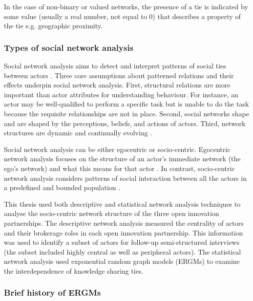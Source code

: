 In the case of non-binary or valued networks, the presence of a tie is indicated by some value (usually a real number, not equal to 0) that describes a property of the tie e.g. geographic proximity.

\subsubsection{Types of social network analysis}

Social network analysis aims to detect and interpret patterns of social ties between actors \citep{de2011exploratory}. Three core assumptions about patterned relations and their effects underpin social network analysis. First, structural relations are more important than actor attributes for understanding behaviour. For instance, an actor may be well-qualified to perform a specific task but is unable to do the task because the requisite relationships are not in place. Second, social networks shape and are shaped by the perceptions, beliefs, and actions of actors. Third, network structures are dynamic and continually evolving \citep{knoke2008social}. \medskip

Social network analysis can be either egocentric or socio-centric. Egocentric network analysis focuses on the structure of an actor's immediate network (the ego's network) and what this means for that actor \citep{chung2005exploring}. In contrast, socio-centric network analysis considers patterns of social interaction between all the actors in a predefined and bounded population \citep{provan2007interorganizational}. \medskip

This thesis used both descriptive and statistical network analysis techniques to analyse the socio-centric network structure of the three open innovation partnerships. The descriptive network analysis measured the centrality of actors and their brokerage roles in each open innovation partnership. This information was used to identify a subset of actors for follow-up semi-structured interviews (the subset included highly central as well as peripheral actors). The statistical network analysis used exponential random graph models (ERGMs) to examine the interdependence of knowledge sharing ties.

\subsubsection{Brief history of ERGMs}

